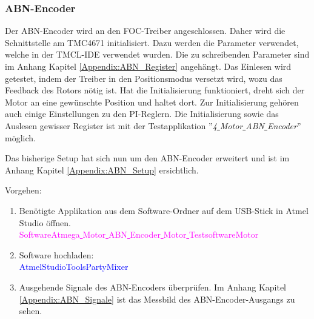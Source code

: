 \newpage
\subsubsection{ABN-Encoder}
\label{subsubsec:Inbetriebnahme_ABN-Encoder}

Der ABN-Encoder wird an den FOC-Treiber angeschlossen. Daher wird die Schnittstelle am TMC4671 initialisiert. Dazu werden die Parameter verwendet, welche in der TMCL-IDE verwendet wurden. Die zu schreibenden Parameter sind im Anhang Kapitel \ref{Appendix:ABN_Register} angehängt. Das Einlesen wird getestet, indem der Treiber in den Positionsmodus versetzt wird, wozu das Feedback des Rotors nötig ist. Hat die Initialisierung funktioniert, dreht sich der Motor an eine gewünschte Position und haltet dort. Zur Initialisierung gehören auch einige Einstellungen zu den PI-Reglern. Die Initialisierung sowie das Auslesen gewisser Register ist mit der Testapplikation ''\textit{4\underline{ }Motor\underline{ }ABN\underline{ }Encoder}'' möglich.

Das bisherige Setup hat sich nun um den ABN-Encoder erweitert und ist im Anhang Kapitel \ref{Appendix:ABN_Setup} ersichtlich.

Vorgehen:
\begin{enumerate}
\item Benötigte Applikation aus dem Software-Ordner auf dem USB-Stick in Atmel Studio öffnen.\\
\textcolor{magenta}{Software\textrightarrow Atmega\underline{ }Motor\underline{ }ABN\underline{ }Encoder\underline{ }Motor\underline{ }Testsoftware\textrightarrow Motor}\\

\item Software hochladen:\\
\textcolor{blue}{AtmelStudio\textrightarrow Tools\textrightarrow PartyMixer}\\

\item Ausgehende Signale des ABN-Encoders überprüfen. Im Anhang Kapitel \ref{Appendix:ABN_Signale} ist das Messbild des ABN-Encoder-Ausgangs zu sehen.

\end{enumerate}